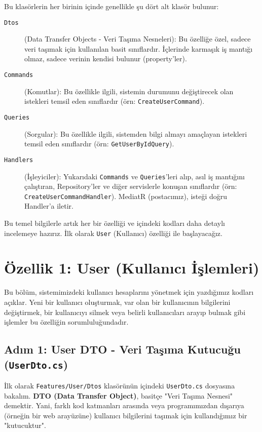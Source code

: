 \documentclass[11pt, a4paper]{article}
\begin{document}
Bu klasörlerin her birinin içinde genellikle şu dört alt klasör bulunur:

\begin{description}
    \item[\texttt{Dtos}] (Data Transfer Objects - Veri Taşıma Nesneleri): Bu özelliğe özel, sadece veri taşımak için kullanılan basit sınıflardır. İçlerinde karmaşık iş mantığı olmaz, sadece verinin kendisi bulunur (property'ler).
    \item[\texttt{Commands}] (Komutlar): Bu özellikle ilgili, sistemin durumunu değiştirecek olan istekleri temsil eden sınıflardır (örn: \texttt{CreateUserCommand}).
    \item[\texttt{Queries}] (Sorgular): Bu özellikle ilgili, sistemden bilgi almayı amaçlayan istekleri temsil eden sınıflardır (örn: \texttt{GetUserByIdQuery}).
    \item[\texttt{Handlers}] (İşleyiciler): Yukarıdaki \texttt{Commands} ve \texttt{Queries}'leri alıp, asıl iş mantığını çalıştıran, Repository'ler ve diğer servislerle konuşan sınıflardır (örn: \texttt{CreateUserCommandHandler}). MediatR (postacımız), isteği doğru Handler'a iletir.
\end{description}

Bu temel bilgilerle artık her bir özelliği ve içindeki kodları daha detaylı incelemeye hazırız. İlk olarak \texttt{User} (Kullanıcı) özelliği ile başlayacağız.

\newpage %

\section{Özellik 1: User (Kullanıcı İşlemleri)}

Bu bölüm, sistemimizdeki kullanıcı hesaplarını yönetmek için yazdığımız kodları açıklar. Yeni bir kullanıcı oluşturmak, var olan bir kullanıcının bilgilerini değiştirmek, bir kullanıcıyı silmek veya belirli kullanıcıları arayıp bulmak gibi işlemler bu özelliğin sorumluluğundadır.

\subsection{Adım 1: User DTO - Veri Taşıma Kutucuğu (\texttt{UserDto.cs})}

İlk olarak \texttt{Features/User/Dtos} klasörünün içindeki \texttt{UserDto.cs} dosyasına bakalım. \textbf{DTO (Data Transfer Object)}, basitçe "Veri Taşıma Nesnesi" demektir. Yani, farklı kod katmanları arasında veya programımızdan dışarıya (örneğin bir web arayüzüne) kullanıcı bilgilerini taşımak için kullandığımız bir "kutucuktur".
\end{document}
